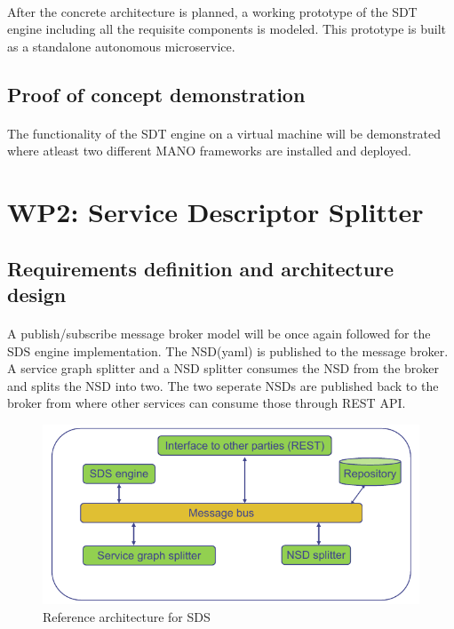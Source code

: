 \paragraph{}
After the concrete architecture is planned, a working prototype of the SDT engine including all the requisite components is modeled. This prototype is built as a standalone autonomous microservice.
\subsection{Proof of concept demonstration}
\paragraph{}
The functionality of the SDT engine on a virtual machine will be demonstrated where atleast two different MANO frameworks are installed and deployed. 

\section{WP2: Service Descriptor Splitter}

\subsection{Requirements definition and architecture design}
\paragraph{}
  A publish/subscribe message broker model will be once again followed for the SDS engine implementation. The NSD(yaml) is published to the message broker. A service graph splitter and a NSD splitter consumes the NSD from the broker and splits the NSD into two. The two seperate NSDs are published back to the broker from where other services can consume those through REST API.
\begin{figure}[h]
	\centering
	\includegraphics[width=0.9\linewidth]{figures/wp2Arch}
	\caption{Reference architecture for SDS \cite{WPDescriptionsPDF}}
	\label{fig:wp2arch}
\end{figure}

